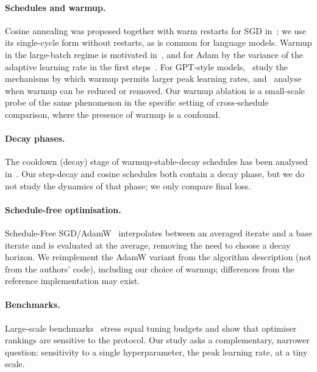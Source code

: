 \paragraph{Schedules and warmup.} Cosine annealing was proposed together with warm restarts for SGD in~\cite{loshchilov2016sgdr}; we use its single-cycle form without restarts, as is common for language models. Warmup in the large-batch regime is motivated in~\cite{goyal2017accurate}, and for Adam by the variance of the adaptive learning rate in the first steps~\cite{liu2019variance}. For GPT-style models,~\cite{kalra2024why} study the mechanisms by which warmup permits larger peak learning rates, and~\cite{kosson2024analyzing} analyse when warmup can be reduced or removed. Our warmup ablation is a small-scale probe of the same phenomenon in the specific setting of cross-schedule comparison, where the presence of warmup is a confound.

\paragraph{Decay phases.} The cooldown (decay) stage of warmup-stable-decay schedules has been analysed in~\cite{dremov2025training}. Our step-decay and cosine schedules both contain a decay phase, but we do not study the dynamics of that phase; we only compare final loss.

\paragraph{Schedule-free optimisation.} Schedule-Free SGD/AdamW~\cite{defazio2024road} interpolates between an averaged iterate and a base iterate and is evaluated at the average, removing the need to choose a decay horizon. We reimplement the AdamW variant from the algorithm description (not from the authors' code), including our choice of warmup; differences from the reference implementation may exist.

\paragraph{Benchmarks.} Large-scale benchmarks~\cite{schmidt2020descending,dahl2023benchmarking} stress equal tuning budgets and show that optimiser rankings are sensitive to the protocol. Our study asks a complementary, narrower question: sensitivity to a single hyperparameter, the peak learning rate, at a tiny scale.
